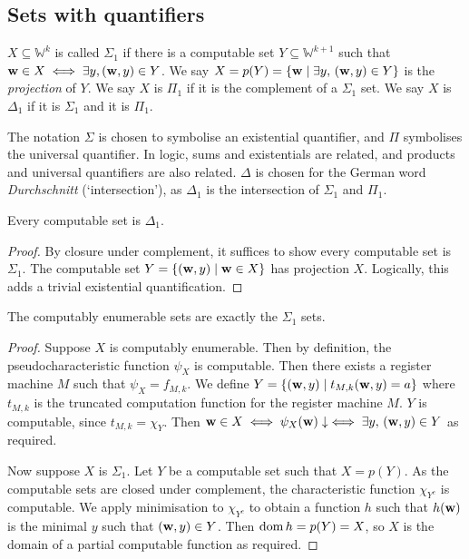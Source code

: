 \subsection{Sets with quantifiers}
\begin{definition}
	\( X \subseteq \mathbb W^k \) is called \( \Sigma_1 \) if there is a computable set \( Y \subseteq \mathbb W^{k+1} \) such that \( \vb w \in X \iff \exists y, (\vb w, y) \in Y \).
	We say \( X = p(Y) = \qty{\vb w \mid \exists y,\, (\vb w, y) \in Y} \) is the \emph{projection} of \( Y \).
	We say \( X \) is \( \Pi_1 \) if it is the complement of a \( \Sigma_1 \) set.
	We say \( X \) is \( \Delta_1 \) if it is \( \Sigma_1 \) and it is \( \Pi_1 \).
\end{definition}
\begin{remark}
	The notation \( \Sigma \) is chosen to symbolise an existential quantifier, and \( \Pi \) symbolises the universal quantifier.
	In logic, sums and existentials are related, and products and universal quantifiers are also related.
	\( \Delta \) is chosen for the German word \emph{Durchschnitt} (`intersection'), as \( \Delta_1 \) is the intersection of \( \Sigma_1 \) and \( \Pi_1 \).
\end{remark}
\begin{proposition}
	Every computable set is \( \Delta_1 \).
\end{proposition}
\begin{proof}
	By closure under complement, it suffices to show every computable set is \( \Sigma_1 \).
	The computable set \( Y = \qty{(\vb w, y) \mid \vb w \in X} \) has projection \( X \).
	Logically, this adds a trivial existential quantification.
\end{proof}
\begin{theorem}
	The computably enumerable sets are exactly the \( \Sigma_1 \) sets.
\end{theorem}
\begin{proof}
	Suppose \( X \) is computably enumerable.
	Then by definition, the pseudocharacteristic function \( \psi_X \) is computable.
	Then there exists a register machine \( M \) such that \( \psi_X = f_{M,k} \).
	We define \( Y = \qty{(\vb w, y) \mid t_{M,k}(\vb w, y) = a} \) where \( t_{M,k} \) is the truncated computation function for the register machine \( M \).
	\( Y \) is computable, since \( t_{M,k} = \chi_Y \).
	Then \( \vb w \in X \iff \psi_X(\vb w) \downarrow \iff \exists y,\, (\vb w, y) \in Y \) as required.

	Now suppose \( X \) is \( \Sigma_1 \).
	Let \( Y \) be a computable set such that \( X = p(Y) \).
	As the computable sets are closed under complement, the characteristic function \( \chi_{Y^c} \) is computable.
	We apply minimisation to \( \chi_{Y^c} \) to obtain a function \( h \) such that \( h(\vb w) \) is the minimal \( y \) such that \( (\vb w, y) \in Y \).
	Then \( \operatorname{dom} h = p(Y) = X \), so \( X \) is the domain of a partial computable function as required.
\end{proof}

